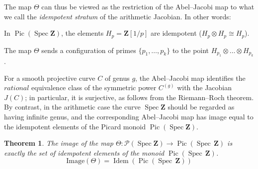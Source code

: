 \documentclass[11pt,a4paper]{article}
\newcommand{\Z}{\mathbf{Z}}
\def\spz{\Spec \Z}
\newcommand{\Spec}{\operatorname{Spec}}
\def\Pic{\operatorname{Pic}}
\def\spz{\Spec \Z}
\theoremstyle{plain}
\newtheorem{thm}{Theorem}[section]
\theoremstyle{definition} %
\begin{document}
The map $\Theta$ can thus be viewed as the restriction of the Abel--Jacobi map
to what we call the \emph{idempotent stratum} of the arithmetic Jacobian. In other words:\vspace{.03in}

In $\Pic(\spz)$, the elements $H_p = \Z[1/p]$ are idempotent ($H_p \otimes H_p \cong H_p$).\vspace{.02in}

The map $\Theta$ sends a configuration of primes $\{p_1, \dots, p_k\}$ to the point $H_{p_1} \otimes \dots \otimes H_{p_k}$.
\vspace{.05in}

   For a smooth projective curve $C$ of genus $g$, the Abel--Jacobi map identifies the
$rational$ equivalence class of the symmetric power $C^{(g)}$ with the Jacobian
$J(C)$; in particular, it is surjective, as follows from the Riemann--Roch theorem.
By contrast, in the arithmetic case the curve $\spz$ should be regarded as having
infinite genus, and the corresponding Abel--Jacobi map has image equal to the
idempotent elements of the Picard monoid $\Pic(\spz)$.



\begin{thm}
The image of the map $\Theta: \mathcal{P}(\Spec \Z) \to  \Pic(\Spec\,\Z)$ is exactly the set of idempotent elements of the monoid $\Pic(\Spec\,\Z)$.
\[
\text{Image}(\Theta) = \operatorname{Idem}(\Pic(\Spec\,\Z)) %
\]
\end{thm}
\end{document}

